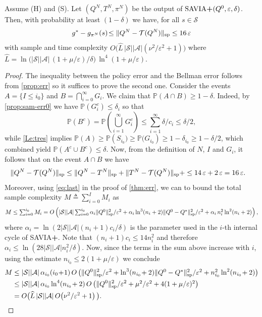 \documentclass{article}
\newcommand{\cA}{\mathcal{A}}
\newcommand{\cS}{\mathcal{S}}
\newcommand{\prob}{\mathbb{P}}
\newcommand{\T}{\mathcal{T}}
\renewcommand{\sp}[1]{\|{#1}\|_\text{\rm sp}}
\newenvironment{manualtheorem}[1]{%
    \renewcommand\themanualtheoreminner{#1}%
  \manualtheoreminner
}{\endmanualtheoreminner}
\theoremstyle{plain}
\theoremstyle{definition}
\theoremstyle{remark}
\begin{document}
\begin{manualtheorem}{\ref{thm:err-D}}
Assume \mbox{\sc (H)} and \mbox{\sc (S)}. Let $(Q^{N},T^{N},\pi^{N})$ be the output of $\mbox{\sc \mbox{\rm SAVIA\textbf{+}}}(Q^0,\varepsilon,\delta)$. Then, with probability at least $(1-\delta)$ we have, for all $s\in\cS$ 
\vspace{-1ex}
\begin{equation*}
g^*-g_{\pi^N}(s)\! \leq \sp{Q^N-\T(Q^N)}\leq 16\,\varepsilon
\end{equation*}
 with sample and time complexity ${O}\big(\widehat{L}\,|\cS||\cA|(
\nu^2/\varepsilon^{2}\!+\!1)\big)$ where $\widehat{L}=\ln\!\big(|\cS||\cA|\,(1\!+\!\mu/\varepsilon)/\delta \big)\,\ln^4(1\!+\!\mu/\varepsilon)$. 
\end{manualtheorem}
\begin{proof}
The inequality between the policy error and the Bellman error follows from \cref{prop:err} so it suffices to prove the second one. Consider the events $A=\{I\leq i_0\}$ and $B=\bigcap_{i=0}^\infty G_i$. We claim that $\prob(A\cap B)\geq 1-\delta$. Indeed, by \cref{prop:sam-err0} we have $\prob( G^c_i) \le \delta_i$ so that
$$\mbox{$\prob(B^c)=\prob(\bigcup^{\infty}_{i=1} G^c_i) \le \sum_{i=1}^\infty {\delta}/{c_i} \leq {\delta}/{2}$},$$
while \cref{Le:tres} implies $\prob(A) \ge \prob \left (S_{i_0}) \ge \prob(G_{i_0} \right ) \geq 1-\delta_{i_0} \geq 1- \delta/2$, which combined yield $\prob(A^c\cup B^c)\leq\delta$.
Now, from the definition of $N$, $I$ and $G_i$, it follows that on the event $A\cap B$ we have
\begin{align*}
    \sp{Q^N-\T(Q^N)}&\leq \sp{Q^N-T^N}+\sp{T^N-\T(Q^N)}+\leq 14\,\varepsilon+2\,\varepsilon=16\,\varepsilon.
\end{align*} 
Moreover, using \eqref{eq:last} in the proof of \cref{thm:err}, we can to bound the total sample complexity $M\triangleq\sum^{I}_{i=0}M_i$ as
$$M\leq \mbox{$\sum^{i_0}_{i=0}M_i=O\left(|\cS||\cA|\sum^{i_0}_{i=0}\alpha_i \sp{Q^0}^2/\varepsilon^{2}+ \mbox{$\alpha_i\ln^3(n_i+2)\sp{Q^0-Q^*}^2/\varepsilon^{2}+\alpha_i\,n_i^2\ln^2(n_i+2)$}\right),$}$$
where $\alpha_i= \ln(2|\cS||\cA|(n_i\!+\!1)c_i/\delta)$ 
is the parameter used in the $i$-th internal cycle of \mbox{\rm SAVIA\textbf{+}}. Note that $(n_i\!+\!1)c_{i}\leq 14 n_{i}^2$ and therefore $\alpha_i\leq \ln(28|\cS||\cA|n_i^2/\delta)$. Now, since the terms in the sum above increase with $i$, using the estimate $n_{i_0} \leq 2(1+\mu/\varepsilon)$ we conclude
\begin{align*}
M &\leq |\cS||\cA|\,\alpha_{i_0}(i_0\!+\!1)\,O\left(  \sp{Q^0}^2/\varepsilon^{2}+ \mbox{$\ln^3(n_{i_0}\!+2)\sp{Q^0-Q^*}^2/\varepsilon^{2}+n_{i_0}^2\ln^2(n_{i_0}\!+2)$}\right)\\
&\leq |\cS||\cA|\, \alpha_{i_0}\ln^4(n_{i_0}\!+2)\,O\left(\sp{Q^0}^2/\varepsilon^{2} + \mbox{$\mu^2/\varepsilon^{2}+4(1+\mu/\varepsilon)^2$}\right)\\
&=O\big( \widehat{L}\,|\cS||\cA|\, O\!\left( \nu^2/\varepsilon^{2}+1\right)\big).
\end{align*}

\vspace{-5ex}
\end{proof}
\end{document}

